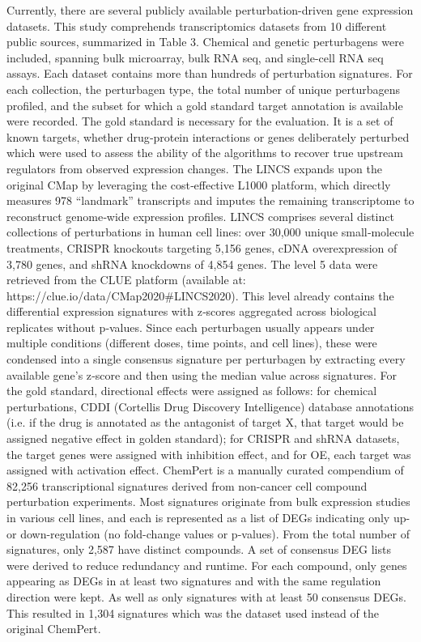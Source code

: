 Currently, there are several publicly available perturbation-driven gene expression datasets. This study comprehends transcriptomics datasets from 10 different public sources, summarized in Table 3. Chemical and genetic perturbagens were included, spanning bulk microarray, bulk RNA seq, and single-cell RNA seq assays. Each dataset contains more than hundreds of perturbation signatures. For each collection, the perturbagen type, the total number of unique perturbagens profiled, and the subset for which a gold standard target annotation is available were recorded. The gold standard is necessary for the evaluation. It is a set of known targets, whether drug‐protein interactions or genes deliberately perturbed which were used to assess the ability of the algorithms to recover true upstream regulators from observed expression changes. 
The LINCS expands upon the original CMap by leveraging the cost‐effective L1000 platform, which directly measures 978 “landmark” transcripts and imputes the remaining transcriptome to reconstruct genome‐wide expression profiles. LINCS comprises several distinct collections of perturbations in human cell lines: over 30,000 unique small‐molecule treatments, CRISPR knockouts targeting 5,156 genes, cDNA overexpression of 3,780 genes, and shRNA knockdowns of 4,854 genes. The level 5 data were retrieved from the CLUE platform (available at: https://clue.io/data/CMap2020#LINCS2020). This level already contains the differential expression signatures with z‐scores aggregated across biological replicates without p‐values. Since each perturbagen usually appears under multiple conditions (different doses, time points, and cell lines), these were condensed into a single consensus signature per perturbagen by extracting every available gene’s z‐score and then using the median value across signatures. For the gold standard, directional effects were assigned as follows: for chemical perturbations, CDDI (Cortellis Drug Discovery Intelligence) database annotations (i.e. if the drug is annotated as the antagonist of target X, that target would be assigned negative effect in golden standard); for CRISPR and shRNA datasets, the target genes were assigned with inhibition effect, and for OE, each target was assigned with activation effect.
ChemPert is a manually curated compendium of 82,256 transcriptional signatures derived from non-cancer cell compound perturbation experiments. Most signatures originate from bulk expression studies in various cell lines, and each is represented as a list of DEGs indicating only up- or down-regulation (no fold-change values or p-values). From the total number of signatures, only 2,587 have distinct compounds. A set of consensus DEG lists were derived to reduce redundancy and runtime. For each compound, only genes appearing as DEGs in at least two signatures and with the same regulation direction were kept. As well as only signatures with at least 50 consensus DEGs. This resulted in 1,304 signatures which was the dataset used instead of the original ChemPert.
